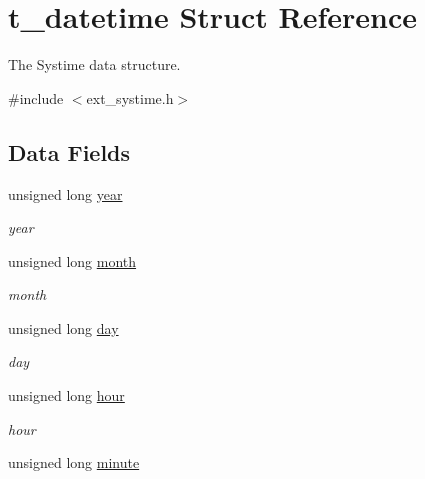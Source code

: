 \hypertarget{structt__datetime}{
\section{t\_\-datetime Struct Reference}
\label{structt__datetime}
}


The Systime data structure.  


{\ttfamily \#include $<$ext\_\-systime.h$>$}\subsection*{Data Fields}
\begin{DoxyCompactItemize}
\item 
\hypertarget{structt__datetime_abdeb780825bf0f952d319bbb120cc6a0}{
unsigned long \hyperlink{structt__datetime_abdeb780825bf0f952d319bbb120cc6a0}{year}}
\label{structt__datetime_abdeb780825bf0f952d319bbb120cc6a0}

\begin{DoxyCompactList}\small\item\em year \item\end{DoxyCompactList}\item 
\hypertarget{structt__datetime_a822566be9424d78fb30b1bf96a0bd6e7}{
unsigned long \hyperlink{structt__datetime_a822566be9424d78fb30b1bf96a0bd6e7}{month}}
\label{structt__datetime_a822566be9424d78fb30b1bf96a0bd6e7}

\begin{DoxyCompactList}\small\item\em month \item\end{DoxyCompactList}\item 
\hypertarget{structt__datetime_a7b7ddf5e7b504628f3cb213c5020193c}{
unsigned long \hyperlink{structt__datetime_a7b7ddf5e7b504628f3cb213c5020193c}{day}}
\label{structt__datetime_a7b7ddf5e7b504628f3cb213c5020193c}

\begin{DoxyCompactList}\small\item\em day \item\end{DoxyCompactList}\item 
\hypertarget{structt__datetime_af659e898c8487c7560c6b6126cb5ff32}{
unsigned long \hyperlink{structt__datetime_af659e898c8487c7560c6b6126cb5ff32}{hour}}
\label{structt__datetime_af659e898c8487c7560c6b6126cb5ff32}

\begin{DoxyCompactList}\small\item\em hour \item\end{DoxyCompactList}\item 
\hypertarget{structt__datetime_aa6a292a540aef681c4437912cbb65ec5}{
unsigned long \hyperlink{structt__datetime_aa6a292a540aef681c4437912cbb65ec5}{minute}}
\label{structt__datetime_aa6a292a540aef681c4437912cbb65ec5}


\end{DoxyCompactItemize}
